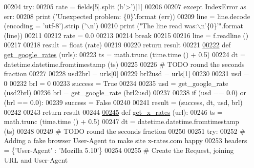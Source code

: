 \begin{DoxyCode}
{{{00204             \textcolor{keywordflow}{try}:
00205                 rate = fields[5].split (b\textcolor{stringliteral}{'>'})[1]
00206                 
00207             \textcolor{keywordflow}{except} IndexError \textcolor{keyword}{as} err:
00208                 \textcolor{keywordflow}{print} (\textcolor{stringliteral}{'Unexpected problem: \{0\}'}.format (err))
00209                 line = line.decode (encoding = \textcolor{stringliteral}{'utf-8'}).strip (\textcolor{stringliteral}{'\(\backslash\)n'})
00210                 \textcolor{keywordflow}{print} (\textcolor{stringliteral}{"The line read was:\(\backslash\)n'\{0\}'"}.format (line))
00211                 
00212                 rate = 0.0
00213             
00214             \textcolor{keywordflow}{break}
00215             
00216         line = f.readline ()
00217     
00218     result = float (rate)
00219     
00220     \textcolor{keywordflow}{return} result
00221     
\hypertarget{exch2exch_8py_source.tex_l00222}{}\hyperlink{namespaceexch2exch_ae0891a93a4a9cfe932011afddd41808d}{00222} \textcolor{keyword}{def }\hyperlink{namespaceexch2exch_ae0891a93a4a9cfe932011afddd41808d}{get\_google\_rates} (urls):
00223     ts = math.trunc (time.time () + 0.5)
00224     dt = datetime.datetime.fromtimestamp (ts)
00225     
00226     \textcolor{comment}{# TODO round the seconds fraction}
00227     
00228     usd2brl = urls[0]
00229     brl2usd = urls[1]
00230     
00231     usd = 0
00232     brl = 0
00233     success = \textcolor{keyword}{True}
00234     
00235     usd = get\_google\_rate (usd2brl)
00236     brl = get\_google\_rate (brl2usd)
00237     
00238     \textcolor{keywordflow}{if} (usd == 0.0) \textcolor{keywordflow}{or} (brl == 0.0):
00239         success = \textcolor{keyword}{False} 
00240         
00241     result = (success, dt, usd, brl)
00242     
00243     \textcolor{keywordflow}{return} result
00244         
\hypertarget{exch2exch_8py_source.tex_l00245}{}\hyperlink{namespaceexch2exch_a928a1249a810cfd0ec5fca3ec8f764fb}{00245} \textcolor{keyword}{def }\hyperlink{namespaceexch2exch_a928a1249a810cfd0ec5fca3ec8f764fb}{get\_x\_rates} (url):
00246     ts = math.trunc (time.time () + 0.5)
00247     dt = datetime.datetime.fromtimestamp (ts)
00248     
00249     \textcolor{comment}{# TODO round the seconds fraction}
00250     
00251     \textcolor{keywordflow}{try}:
00252         \textcolor{comment}{# Adding a fake browser User-Agent to make site x-rates.com happy}
00253         headers = \{\textcolor{stringliteral}{'User-Agent'} : \textcolor{stringliteral}{'Mozilla 5.10'}\}
00254             
00255         \textcolor{comment}{# Create the Request, joining URL and User-Agent}
}}}
\end{DoxyCode}
